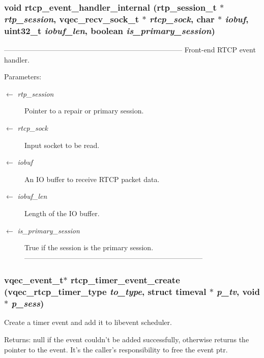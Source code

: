 \subsubsection{\setlength{\rightskip}{0pt plus 5cm}void rtcp\_\-event\_\-handler\_\-internal (rtp\_\-session\_\-t $\ast$ {\em rtp\_\-session}, vqec\_\-recv\_\-sock\_\-t $\ast$ {\em rtcp\_\-sock}, char $\ast$ {\em iobuf}, uint32\_\-t {\em iobuf\_\-len}, boolean {\em is\_\-primary\_\-session})}\label{vqec__rtp_8h_476870a2570664e165ce779338f33827}


--------------------------------------------------------------------------- Front-end RTCP event handler.

\begin{Desc}
\item[Parameters:]
\begin{description}
\item[\mbox{$\leftarrow$} {\em rtp\_\-session}]Pointer to a repair or primary session. \item[\mbox{$\leftarrow$} {\em rtcp\_\-sock}]Input socket to be read. \item[\mbox{$\leftarrow$} {\em iobuf}]An IO buffer to receive RTCP packet data. \item[\mbox{$\leftarrow$} {\em iobuf\_\-len}]Length of the IO buffer. \item[\mbox{$\leftarrow$} {\em is\_\-primary\_\-session}]True if the session is the primary session. --------------------------------------------------------------------------- \end{description}
\end{Desc}
\subsubsection{\setlength{\rightskip}{0pt plus 5cm}vqec\_\-event\_\-t$\ast$ rtcp\_\-timer\_\-event\_\-create (\bf{vqec\_\-rtcp\_\-timer\_\-type} {\em to\_\-type}, struct timeval $\ast$ {\em p\_\-tv}, void $\ast$ {\em p\_\-sess})}\label{vqec__rtp_8h_4083ee4b737ceb7aaffc7e0738b543a0}


Create a timer event and add it to libevent scheduler. \begin{Desc}
\item[Returns:]null if the event couldn't be added successfully, otherwise returns the pointer to the event. It's the caller's responsibility to free the event ptr. \end{Desc}
